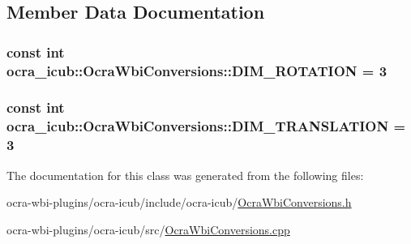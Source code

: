 \subsection{\-Member \-Data \-Documentation}
\hypertarget{classocra__icub_1_1OcraWbiConversions_a05e66392df58e9dda2d4db590bdd65a0}{
\subsubsection[{\-D\-I\-M\-\_\-\-R\-O\-T\-A\-T\-I\-O\-N}]{\setlength{\rightskip}{0pt plus 5cm}const int {\bf ocra\-\_\-icub\-::\-Ocra\-Wbi\-Conversions\-::\-D\-I\-M\-\_\-\-R\-O\-T\-A\-T\-I\-O\-N} = 3}}\label{classocra__icub_1_1OcraWbiConversions_a05e66392df58e9dda2d4db590bdd65a0}
\hypertarget{classocra__icub_1_1OcraWbiConversions_a7c628bd1208c5e70be458d4dffda4d06}{
\subsubsection[{\-D\-I\-M\-\_\-\-T\-R\-A\-N\-S\-L\-A\-T\-I\-O\-N}]{\setlength{\rightskip}{0pt plus 5cm}const int {\bf ocra\-\_\-icub\-::\-Ocra\-Wbi\-Conversions\-::\-D\-I\-M\-\_\-\-T\-R\-A\-N\-S\-L\-A\-T\-I\-O\-N} = 3}}\label{classocra__icub_1_1OcraWbiConversions_a7c628bd1208c5e70be458d4dffda4d06}


\-The documentation for this class was generated from the following files\-:\begin{DoxyCompactItemize}
\item 
ocra-\/wbi-\/plugins/ocra-\/icub/include/ocra-\/icub/\hyperlink{OcraWbiConversions_8h}{\-Ocra\-Wbi\-Conversions.\-h}\item 
ocra-\/wbi-\/plugins/ocra-\/icub/src/\hyperlink{OcraWbiConversions_8cpp}{\-Ocra\-Wbi\-Conversions.\-cpp}\end{DoxyCompactItemize}
